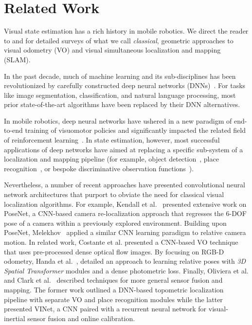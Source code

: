 \section{Related Work}
Visual state estimation has a rich history in mobile robotics. We direct the reader to \citep{Scaramuzza2011-qr} and \citep{Cadena2016-ds} for detailed surveys of what we call \textit{classical}, geometric approaches to visual odometry (VO) and visual simultaneous localization and mapping (SLAM).

In the past decade, much of machine learning and its sub-disciplines has been revolutionized by carefully constructed deep neural networks (DNNs)~\citep{LeCun2015-qf}. For tasks like image segmentation, classification, and natural language processing, most prior state-of-the-art algorithms have been replaced by their DNN alternatives.

In mobile robotics, deep neural networks have ushered in a new paradigm of end-to-end training of visuomotor policies \citep{Levine2016-bj} and significantly impacted the related field of reinforcement learning~\citep{Duan2016-jw}. In state estimation, however, most successful applications of deep networks have aimed at replacing a specific sub-system of a localization and mapping pipeline (for example, object detection~\citep{yang2016exploit}, place recognition~\citep{Sunderhauf2015-oc}, or bespoke discriminative observation functions~\citep{Haarnoja2016-ph}).

Nevertheless, a number of recent approaches have presented convolutional neural network architectures that purport to obviate the need for classical visual localization algorithms. For example, Kendall et al.~\citep{Kendall2015-ew,Kendall2017-u} presented extensive work on PoseNet, a CNN-based camera re-localization approach that regresses the 6-DOF pose of a camera within a previously explored environment. Building upon PoseNet, Melekhov~\citep{Melekhov2017-dl} applied a similar CNN learning paradigm to relative camera motion. In related work, Costante et al. \citep{Costante2016-hb} presented a CNN-based VO technique that uses pre-processed dense optical flow images. By focusing on RGB-D odometry, Handa et al.~\cite{Handa2016-hm}, detailed an approach to learning relative poses with \textit{3D Spatial Transformer} modules and a dense photometric loss. Finally, Oliviera et al. \citep{Oliveira2017-lt} and Clark et al.~\citep{Clark2017} described techniques for more general sensor fusion and mapping. The former work outlined a DNN-based topometric localization pipeline with separate VO and place recognition modules while the latter presented VINet, a CNN paired with a recurrent neural network for visual-inertial sensor fusion and online calibration.


